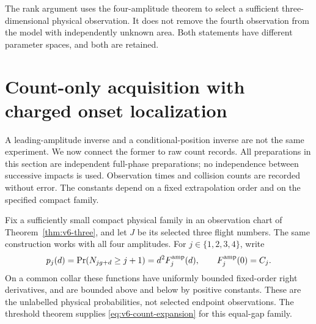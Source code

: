 The rank argument uses the four-amplitude theorem to select a sufficient
three-dimensional physical observation. It does not remove the fourth
observation from the model with independently unknown area. Both
statements have different parameter spaces, and both are retained.

\section{Count-only acquisition with charged onset localization}
\label{sec:v6-count-acquisition}
A leading-amplitude inverse and a conditional-position inverse are not
the same experiment. We now connect the former to raw count records.
All preparations in this section are independent full-phase preparations;
no independence between successive impacts is used. Observation times
and collision counts are recorded without error. The constants depend
on a fixed extrapolation order and on the specified compact family.

Fix a sufficiently small compact physical family in an observation chart
of Theorem~\ref{thm:v6-three}, and let $J$ be its selected three flight
numbers. The same construction works with all four amplitudes.
For $j\in\{1,2,3,4\}$, write
\begin{equation}\label{eq:v6-count-expansion}
 p_j(d)=\Pr(N_{jg+d}\ge j+1)=d^2F_j^{\rm amp}(d),\qquad
 F_j^{\rm amp}(0)=C_j.
\end{equation}
On a common collar these functions have uniformly bounded fixed-order
right derivatives, and are bounded above and below by positive constants.
These are the unlabelled physical probabilities, not selected endpoint
observations. The threshold theorem supplies
\eqref{eq:v6-count-expansion} for this equal-gap family.

